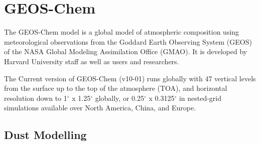 \section{GEOS-Chem}
The GEOS-Chem model is a global model of atmospheric composition using meteorological observations from the Goddard Earth Observing System (GEOS) of the NASA Global Modeling Assimilation Office (GMAO). It is developed by Harvard University staff as well as users and researchers. 

The Current version of GEOS-Chem (v10-01) runs globally with 47 vertical levels from the surface up to the top of the atmosphere (TOA), and horizontal resolution down to 1$^{\circ}$ x 1.25$^{\circ}$ globally, or 0.25$^{\circ}$ x 0.3125$^{\circ}$ in nested-grid simulations available over North America, China, and Europe.

\subsection{Dust Modelling}
